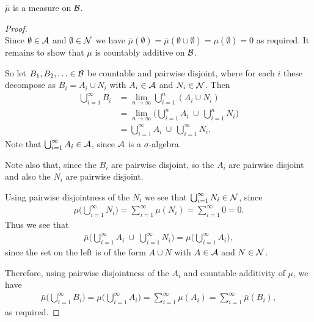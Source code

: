 \begin{claim*}
  $\bar{\mu}$ is a measure on $\mathcal B$.
\end{claim*}

\begin{proof}~\\
  Since $\emptyset \in \mathcal A$ and $\emptyset \in \mathcal N$ we
  have $\bar\mu(\emptyset) = \bar\mu(\emptyset \cup \emptyset) = \mu(\emptyset) = 0$ as required. It remains to
  show that $\bar\mu$ is countably additive on $\mathcal B$.

  So let $B_1, B_2, \ldots \in \mathcal B$ be countable and pairwise disjoint, where for each $i$ these decompose
  as $B_i = A_i \cup N_i$ with $A_i \in \mathcal A$ and $N_i \in \mathcal N$. Then
  \begin{align*}
    \bigcup_{i=1}^\infty B_i
    &= \lim_{n\to\infty}\bigcup_{i=1}^n (A_i \cup N_i) \\
    &= \lim_{n\to\infty} \Big(\bigcup_{i=1}^n A_i ~\cup~ \bigcup_{i=1}^n N_i\Big) \\
    &= \bigcup_{i=1}^\infty A_i ~\cup~ \bigcup_{i=1}^\infty N_i.
  \end{align*}
  Note that $\bigcup_{i=1}^\infty A_i \in \mathcal A$, since $\mathcal A$ is a $\sigma$-algebra.

  Note also that, since the $B_i$ are pairwise disjoint, so the $A_i$ are pairwise disjoint and also the $N_i$
  are pairwise disjoint.

  Using pairwise disjointness of the $N_i$ we see that $\bigcup_{i=1}^\infty N_i \in \mathcal N$, since
  \begin{align*}
    \mu\Big(\bigcup_{i=1}^\infty N_i\Big) = \sum_{i=1}^\infty \mu(N_i) = \sum_{i=1}^\infty 0 = 0.
  \end{align*}
  Thus we see that
  \begin{align*}
    \bar\mu\Big(\bigcup_{i=1}^\infty A_i ~\cup~ \bigcup_{i=1}^\infty N_i\Big) = \mu\Big(\bigcup_{i=1}^\infty A_i\Big),
  \end{align*}
  since the set on the left is of the form $A \cup N$ with $A \in \mathcal A$ and $N \in \mathcal N$.

  Therefore, using pairwise disjointness of the $A_i$ and countable additivity of $\mu$, we have
  \begin{align*}
    \bar\mu\Big(\bigcup_{i=1}^\infty B_i\Big)
    = \mu\Big(\bigcup_{i=1}^\infty A_i\Big)
    = \sum_{i=1}^\infty \mu(A_i)
    = \sum_{i=1}^\infty \bar\mu(B_i),
  \end{align*}
  as required.
\end{proof}

